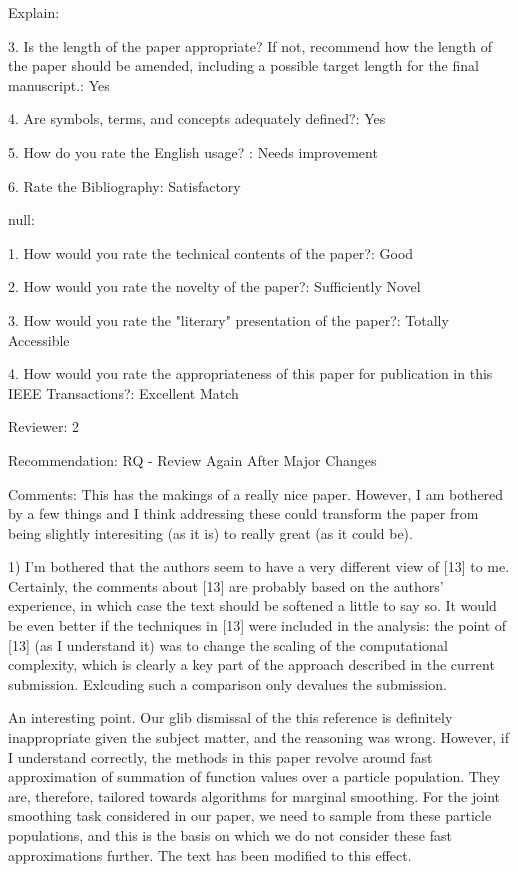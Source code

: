 \documentclass{article}
\begin{document}
Explain:

3. Is the length of the paper appropriate? If not, recommend how the length of the paper should be amended, including a possible target length for the final manuscript.: Yes

4. Are symbols, terms, and concepts adequately defined?: Yes

5. How do you rate the English usage? : Needs improvement

6. Rate the Bibliography: Satisfactory

null:

1. How would you rate the technical contents of the paper?: Good

2. How would you rate the novelty of the paper?: Sufficiently Novel

3. How would you rate the "literary" presentation of the paper?: Totally Accessible

4. How would you rate the appropriateness of this paper for publication in this IEEE Transactions?: Excellent Match


Reviewer: 2

Recommendation: RQ - Review Again After Major Changes

Comments:
This has the makings of a really nice paper. However, I am bothered by a few things and I think addressing these could transform the paper from being slightly interesiting (as it is) to really great (as it could be).

1) I'm bothered that the authors seem to have a very different view of [13] to me. Certainly, the comments about [13] are probably based on the authors' experience, in which case the text should be softened a little to say so. It would be even better if the techniques in [13] were included in the analysis: the point of [13] (as I understand it) was to change the scaling of the computational complexity, which is clearly a key part of the approach described in the current submission. Exlcuding such a comparison only devalues the submission.

{\meta An interesting point. Our glib dismissal of the this reference is definitely inappropriate given the subject matter, and the reasoning was wrong. However, if I understand correctly, the methods in this paper revolve around fast approximation of summation of function values over a particle population. They are, therefore, tailored towards algorithms for marginal smoothing. For the joint smoothing task considered in our paper, we need to sample from these particle populations, and this is the basis on which we do not consider these fast approximations further. The text has been modified to this effect. }
\end{document}
